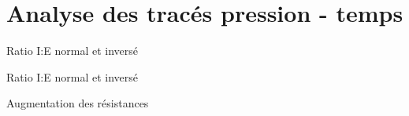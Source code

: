 \documentclass[aspectratio=169]{beamer}
\begin{document}
\section{Analyse des tracés pression - temps}

\begin{frame}{Ratio I:E normal et inversé}
	
\end{frame}

\begin{frame}{Ratio I:E normal et inversé}
	
\end{frame}

\begin{frame}{Augmentation des résistances}
	\centering
	
\end{frame}
\end{document}
